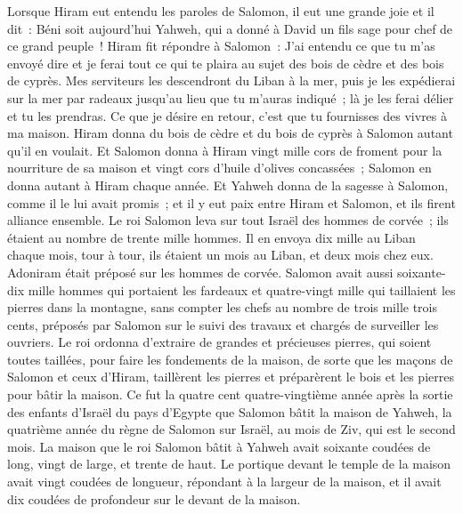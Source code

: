 \begin{multicols}{2}
Lorsque Hiram eut entendu les paroles de Salomon, il eut une grande joie et il dit~: Béni soit aujourd'hui Yahweh, qui a donné à David un fils sage pour chef de ce grand peuple~!
Hiram fit répondre à Salomon~: J'ai entendu ce que tu m'as envoyé dire et je ferai tout ce qui te plaira au sujet des bois de cèdre et des bois de cyprès.
Mes serviteurs les descendront du Liban à la mer, puis je les expédierai sur la mer par radeaux jusqu'au lieu que tu m'auras indiqué~; là je les ferai délier et tu les prendras. Ce que je désire en retour, c'est que tu fournisses des vivres à ma maison.
Hiram donna du bois de cèdre et du bois de cyprès à Salomon autant qu'il en voulait.
Et Salomon donna à Hiram vingt mille cors de froment pour la nourriture de sa maison et vingt cors d'huile d'olives concassées~; Salomon en donna autant à Hiram chaque année.
Et Yahweh donna de la sagesse à Salomon, comme il le lui avait promis~; et il y eut paix entre Hiram et Salomon, et ils firent alliance ensemble.
Le roi Salomon leva sur tout Israël des hommes de corvée~; ils étaient au nombre de trente mille hommes.
Il en envoya dix mille au Liban chaque mois, tour à tour, ils étaient un mois au Liban, et deux mois chez eux. Adoniram était préposé sur les hommes de corvée.
Salomon avait aussi soixante-dix mille hommes qui portaient les fardeaux et quatre-vingt mille qui taillaient les pierres dans la montagne,
sans compter les chefs au nombre de trois mille trois cents, préposés par Salomon sur le suivi des travaux et chargés de surveiller les ouvriers.
Le roi ordonna d'extraire de grandes et précieuses pierres, qui soient toutes taillées, pour faire les fondements de la maison,
de sorte que les maçons de Salomon et ceux d'Hiram, taillèrent les pierres et préparèrent le bois et les pierres pour bâtir la maison.
\VerseOne{}Ce fut la quatre cent quatre-vingtième année après la sortie des enfants d'Israël du pays d'Egypte que Salomon bâtit la maison de Yahweh, la quatrième année du règne de Salomon sur Israël, au mois de Ziv, qui est le second mois.
La maison que le roi Salomon bâtit à Yahweh avait soixante coudées de long, vingt de large, et trente de haut.
Le portique devant le temple de la maison avait vingt coudées de longueur, répondant à la largeur de la maison, et il avait dix coudées de profondeur sur le devant de la maison.

\end{multicols}
